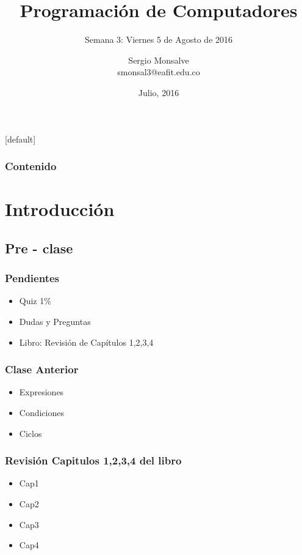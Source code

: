\documentclass[xcolor=svgnames]{beamer}
\title[ST0240-063]{Programación de Computadores }
\subtitle{Semana 3: Viernes 5 de Agosto de 2016}
\author{
  Sergio Monsalve \\
  smonsal3@eafit.edu.co
}
\institute{
  Departamento de Informática y Sistemas \\
  Universidad EAFIT, Medellin, Colombia\\\vspace{0.5cm}
}
\date{Julio, 2016}
\makeatletter
\theoremstyle{example}
\newenvironment{withoutheadline}{
        \setbeamertemplate{headline}[default]
        \def\beamer@entrycode{\vspace*{-\headheight}}
    }{}
\makeatother
\begin{document}
	
\begin{frame}[plain]
	\titlepage
\end{frame}


\begin{withoutheadline}
  \begin{frame}
    \setcounter{tocdepth}{1}
    \frametitle{Contenido}     
    \tableofcontents
  \end{frame}
\end{withoutheadline}


\section{Introducción}

\subsection{Pre - clase}

\begin{frame}
  \frametitle{Pendientes}
  \begin{itemize}
  \item Quiz 1\%
  \item Dudas y Preguntas
  \item Libro: Revisión de Capítulos 1,2,3,4
  \end{itemize}
\end{frame}

\begin{frame}
  \frametitle{Clase Anterior}
  \begin{itemize}
    \item Expresiones
    \item Condiciones
    \item Ciclos
  \end{itemize}
\end{frame}


\begin{frame}
  \frametitle{Revisión Capitulos 1,2,3,4 del libro}
  \begin{itemize}
  \item Cap1
  \item Cap2
  \item Cap3
  \item Cap4
  \end{itemize}
\end{frame}
\end{document}
